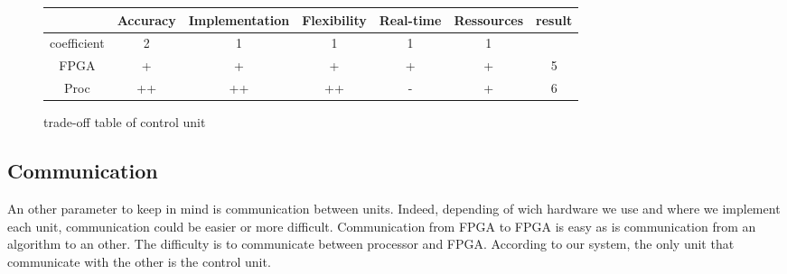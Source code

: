 \begin{figure}[!ht]
\hspace{-1cm}
\begin{tabular}{|c|c|c|c|c|c|c|}\hline
                         & Accuracy  & Implementation & Flexibility & Real-time & Ressources & result \\\hline
coefficient   &         2          &           1                      &         1           &           1         &         1               &             \\\hline
FPGA            &      +            &            +                     &         +          &          +         &         +              &   5     \\\hline
Proc               &      ++          &          ++                   &         ++       &         -           &         +              &       6    \\\hline
\end{tabular}
\caption{trade-off table of control unit}
\end{figure}

\subsection{Communication}

An other parameter to keep in mind is communication between units. Indeed, depending of wich hardware we use and where we implement each unit, communication could be easier or more difficult. Communication from FPGA to FPGA is easy as is communication from an algorithm to an other. The difficulty is to communicate between processor and FPGA. According to our system, the only unit that communicate with the other is the control unit. 

